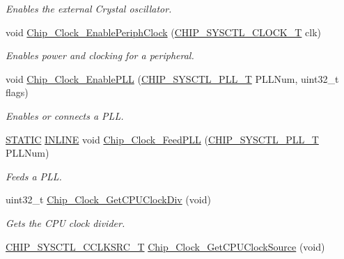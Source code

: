 \begin{DoxyCompactItemize}
\begin{DoxyCompactList}\small\item\em Enables the external Crystal oscillator. \end{DoxyCompactList}\item 
void \hyperlink{group__CLOCK__17XX__40XX_gac63024a1f928ba359c4f4cac7e48fe39}{Chip\+\_\+\+Clock\+\_\+\+Enable\+Periph\+Clock} (\hyperlink{group__CLOCK__17XX__40XX_ga82e75cbe777e79f448fec3987ddd978e}{C\+H\+I\+P\+\_\+\+S\+Y\+S\+C\+T\+L\+\_\+\+C\+L\+O\+C\+K\+\_\+T} clk)
\begin{DoxyCompactList}\small\item\em Enables power and clocking for a peripheral. \end{DoxyCompactList}\item 
void \hyperlink{group__CLOCK__17XX__40XX_ga2f3b19dee294433937973fb4fedfe3f6}{Chip\+\_\+\+Clock\+\_\+\+Enable\+P\+LL} (\hyperlink{group__SYSCTL__17XX__40XX_ga5f5478a201b021ed04a0724bff524c4b}{C\+H\+I\+P\+\_\+\+S\+Y\+S\+C\+T\+L\+\_\+\+P\+L\+L\+\_\+T} P\+L\+L\+Num, uint32\+\_\+t flags)
\begin{DoxyCompactList}\small\item\em Enables or connects a P\+LL. \end{DoxyCompactList}\item 
\hyperlink{group__LPC__Types__Public__Macros_ga10b2d890d871e1489bb02b7e70d9bdfb}{S\+T\+A\+T\+IC} \hyperlink{group__LPC__Types__Public__Types_ga2eb6f9e0395b47b8d5e3eeae4fe0c116}{I\+N\+L\+I\+NE} void \hyperlink{group__CLOCK__17XX__40XX_ga4d4cc965838cf2c5cddafd07aa66a790}{Chip\+\_\+\+Clock\+\_\+\+Feed\+P\+LL} (\hyperlink{group__SYSCTL__17XX__40XX_ga5f5478a201b021ed04a0724bff524c4b}{C\+H\+I\+P\+\_\+\+S\+Y\+S\+C\+T\+L\+\_\+\+P\+L\+L\+\_\+T} P\+L\+L\+Num)
\begin{DoxyCompactList}\small\item\em Feeds a P\+LL. \end{DoxyCompactList}\item 
uint32\+\_\+t \hyperlink{group__CLOCK__17XX__40XX_ga3e1ef8ac1f9c19b33016c914b01fd9a4}{Chip\+\_\+\+Clock\+\_\+\+Get\+C\+P\+U\+Clock\+Div} (void)
\begin{DoxyCompactList}\small\item\em Gets the C\+PU clock divider. \end{DoxyCompactList}\item 
\hyperlink{group__CLOCK__17XX__40XX_ga983f42d70f3939d1f1b46673e9e1f838}{C\+H\+I\+P\+\_\+\+S\+Y\+S\+C\+T\+L\+\_\+\+C\+C\+L\+K\+S\+R\+C\+\_\+T} \hyperlink{group__CLOCK__17XX__40XX_ga84a5acda2829b05c81326606630b7238}{Chip\+\_\+\+Clock\+\_\+\+Get\+C\+P\+U\+Clock\+Source} (void)

\end{DoxyCompactItemize}
